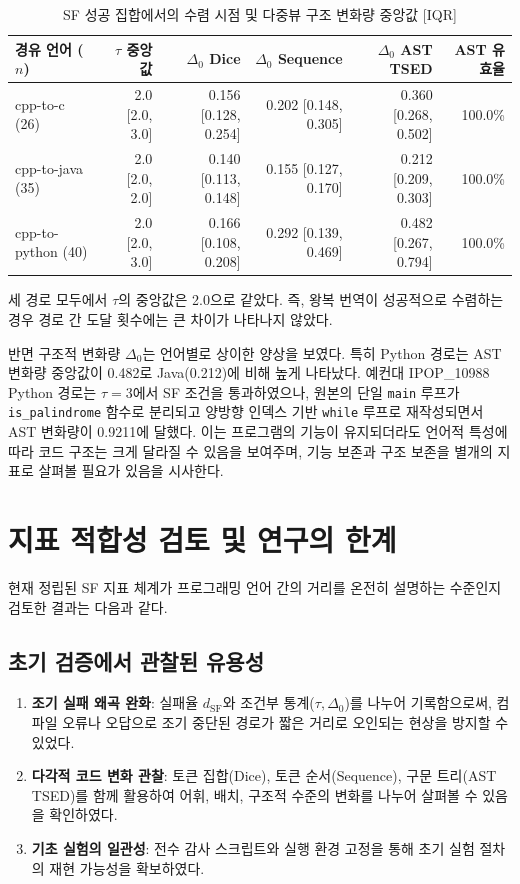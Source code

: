 \documentclass[a4paper,10pt,twocolumn,twoside]{article}
\newcommand{\dsf}{d_{\mathrm{SF}}}
\begin{document}
\begin{table}[t]
\centering
\footnotesize
\setlength{\tabcolsep}{7pt}
\caption{SF 성공 집합에서의 수렴 시점 및 다중뷰 구조 변화량 중앙값 [IQR]}
\begin{tabular}{lrrrrr}
\toprule
경유 언어 ($n$) & $\tau$ 중앙값 & $\Delta_0$ Dice & $\Delta_0$ Sequence & $\Delta_0$ AST TSED & AST 유효율 \\
\midrule
cpp-to-c (26) & 2.0 [2.0, 3.0] & 0.156 [0.128, 0.254] & 0.202 [0.148, 0.305] & 0.360 [0.268, 0.502] & 100.0\% \\
cpp-to-java (35) & 2.0 [2.0, 2.0] & 0.140 [0.113, 0.148] & 0.155 [0.127, 0.170] & 0.212 [0.209, 0.303] & 100.0\% \\
cpp-to-python (40) & 2.0 [2.0, 3.0] & 0.166 [0.108, 0.208] & 0.292 [0.139, 0.469] & 0.482 [0.267, 0.794] & 100.0\% \\
\bottomrule
\end{tabular}
\end{table}

세 경로 모두에서 $\tau$의 중앙값은 2.0으로 같았다. 즉, 왕복 번역이 성공적으로 수렴하는 경우 경로 간 도달 횟수에는 큰 차이가 나타나지 않았다.

반면 구조적 변화량 $\Delta_0$는 언어별로 상이한 양상을 보였다. 특히 Python 경로는 AST 변화량 중앙값이 0.482로 Java(0.212)에 비해 높게 나타났다. 예컨대 IPOP\_10988 Python 경로는 $\tau=3$에서 SF 조건을 통과하였으나, 원본의 단일 \texttt{main} 루프가 \texttt{is\_palindrome} 함수로 분리되고 양방향 인덱스 기반 \texttt{while} 루프로 재작성되면서 AST 변화량이 0.9211에 달했다. 이는 프로그램의 기능이 유지되더라도 언어적 특성에 따라 코드 구조는 크게 달라질 수 있음을 보여주며, 기능 보존과 구조 보존을 별개의 지표로 살펴볼 필요가 있음을 시사한다.

\section{지표 적합성 검토 및 연구의 한계}

현재 정립된 SF 지표 체계가 프로그래밍 언어 간의 거리를 온전히 설명하는 수준인지 검토한 결과는 다음과 같다.

\subsection{초기 검증에서 관찰된 유용성}
\begin{enumerate}
\item \textbf{조기 실패 왜곡 완화}: 실패율 $\dsf$와 조건부 통계($\tau, \Delta_0$)를 나누어 기록함으로써, 컴파일 오류나 오답으로 조기 중단된 경로가 짧은 거리로 오인되는 현상을 방지할 수 있었다.
\item \textbf{다각적 코드 변화 관찰}: 토큰 집합(Dice), 토큰 순서(Sequence), 구문 트리(AST TSED)를 함께 활용하여 어휘, 배치, 구조적 수준의 변화를 나누어 살펴볼 수 있음을 확인하였다.
\item \textbf{기초 실험의 일관성}: 전수 감사 스크립트와 실행 환경 고정을 통해 초기 실험 절차의 재현 가능성을 확보하였다.
\end{enumerate}
\end{document}
